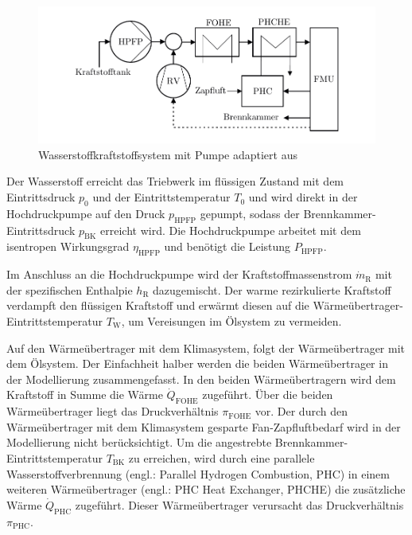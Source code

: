 \begin{figure}[ht]
\centering
\includegraphics[width=1\linewidth]{4_Abbildungen/2_Hauptteil/Kraftstoffsystem Abbildungen/pump.pdf}
  \caption{Wasserstoffkraftstoffsystem mit Pumpe adaptiert aus \cite{Brewer.1991}}
  \label{fig:pumpe}
\end{figure}
\FloatBarrier 

Der Wasserstoff erreicht das Triebwerk im flüssigen Zustand mit dem Eintrittsdruck $p_0$ und der Eintrittstemperatur $T_0$ und wird direkt in der Hochdruckpumpe auf den Druck $p_{\mathrm{HPFP}}$ gepumpt, sodass der Brennkammer-Eintrittsdruck $p_{\mathrm{BK}}$ erreicht wird. Die Hochdruckpumpe arbeitet mit dem isentropen Wirkungsgrad $\eta_{\mathrm{HPFP}}$ und benötigt die Leistung $P_{\mathrm{HPFP}}$. 

Im Anschluss an die Hochdruckpumpe wird der Kraftstoffmassenstrom $\dot{m}_\mathrm{R}$ mit der spezifischen Enthalpie $h_\mathrm{R}$ dazugemischt. Der warme rezirkulierte Kraftstoff verdampft den flüssigen Kraftstoff und erwärmt diesen auf die Wärmeübertrager-Eintrittstemperatur $T_\mathrm{W}$, um Vereisungen im Ölsystem zu vermeiden.

Auf den Wärmeübertrager mit dem Klimasystem, folgt der Wärmeübertrager mit dem Ölsystem. Der Einfachheit halber werden die beiden Wärmeübertrager in der Modellierung zusammengefasst. In den beiden Wärmeübertragern wird dem Kraftstoff in Summe die Wärme $\dot{Q}_{\mathrm{FOHE}}$ zugeführt. Über die beiden Wärmeübertrager liegt das Druckverhältnis $\pi_{\mathrm{FOHE}}$ vor. Der durch den Wärmeübertrager mit dem Klimasystem gesparte Fan-Zapfluftbedarf wird in der Modellierung nicht berücksichtigt. Um die angestrebte Brennkammer-Eintrittstemperatur $T_{\mathrm{BK}}$ zu erreichen, wird durch eine parallele Wasserstoffverbrennung (engl.: Parallel Hydrogen Combustion, PHC) in einem weiteren Wärmeübertrager (engl.: PHC Heat Exchanger, PHCHE) die zusätzliche Wärme $\dot{Q}_{\mathrm{PHC}}$ zugeführt. Dieser Wärmeübertrager verursacht das Druckverhältnis $\pi_{\mathrm{PHC}}$. 

